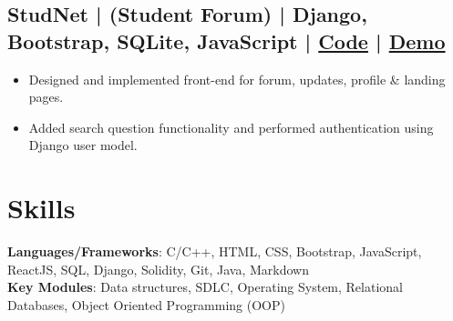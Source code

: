 \documentclass[a4,10pt]{article}
\newenvironment{zitemize}{
\begin{itemize}\itemsep0pt \parskip0pt \parsep1pt}
{\end{itemize}\vspace{-0.5cm}}
\begin{document}
\subsection*{StudNet {\normalsize\normalfont | (Student Forum) | Django, Bootstrap, SQLite, JavaScript} |  {\href{https://github.com/DevelopersLeague/StudNet}{Code} }|  {\href{https://stud-net.herokuapp.com/}{Demo} }} 
    \begin{zitemize}
        \item Designed and implemented front-end for forum, updates, profile \& landing pages.
        \item Added search question functionality and performed authentication using Django user model.
    \end{zitemize}

\vspace{0.1cm}

        




\section{Skills}
\textbf{Languages/Frameworks}: C/C++, HTML, CSS, Bootstrap, JavaScript, ReactJS, SQL, Django, Solidity, Git, Java, Markdown \\ 
\textbf{Key Modules}: Data structures, SDLC, Operating System, Relational Databases, Object Oriented Programming (OOP)
\end{document}
